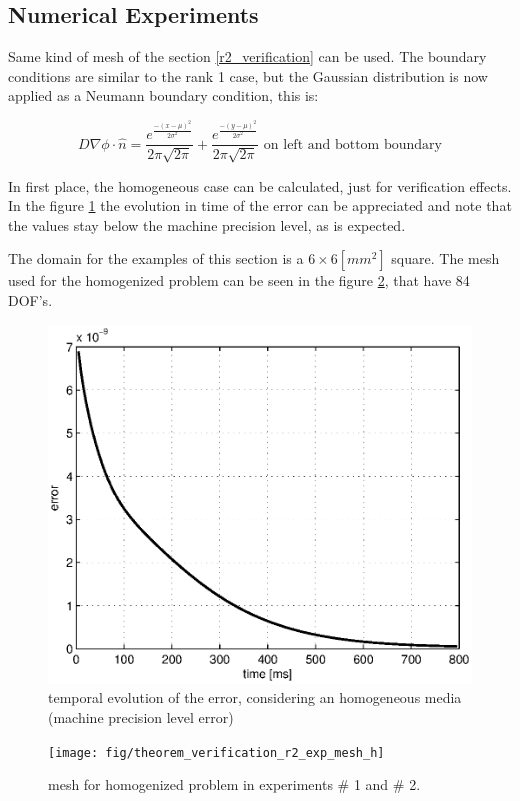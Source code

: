
\newpage
\subsection{Numerical Experiments}

Same kind of mesh of the section \ref{r2_verification} can be used. The boundary conditions are similar to the rank 1 case, but the Gaussian distribution is now applied as a Neumann boundary condition, this is:

\begin{equation*}
D \nabla \phi \cdot \hat{n} = \dfrac{ e^{\frac{-(x - \mu)^2}{2 \sigma^2}}}{2 \pi \sqrt{2 \pi}} + \dfrac{ e^{\frac{-(y - \mu)^2}{2 \sigma^2}}}{2 \pi \sqrt{2 \pi}} \text{ on left and bottom boundary}
\end{equation*}

In first place, the homogeneous case can be calculated, just for verification effects. In the figure \ref{fig:error_homo} the evolution in time of the error can be appreciated and note that the values stay below the machine precision level, as is expected.

The domain for the examples of this section is a $6 \times 6 [mm^2]$ square. The mesh used for the homogenized problem can be seen in the figure \ref{fig:mesh_h_r2}, that have 84 DOF's.

\begin{figure}[H]
\centering
\includegraphics[height = 6 cm]{fig/theorem_verification_r2_error_homo}
\caption{temporal evolution of the error, considering an homogeneous media (machine precision level error)}\label{fig:error_homo}
\end{figure}

\begin{figure}[H]
\centering
\texttt{[image: fig/theorem\_verification\_r2\_exp\_mesh\_h]}
\caption{mesh for homogenized problem in experiments \# 1 and \# 2.} \label{fig:mesh_h_r2}
\end{figure}


